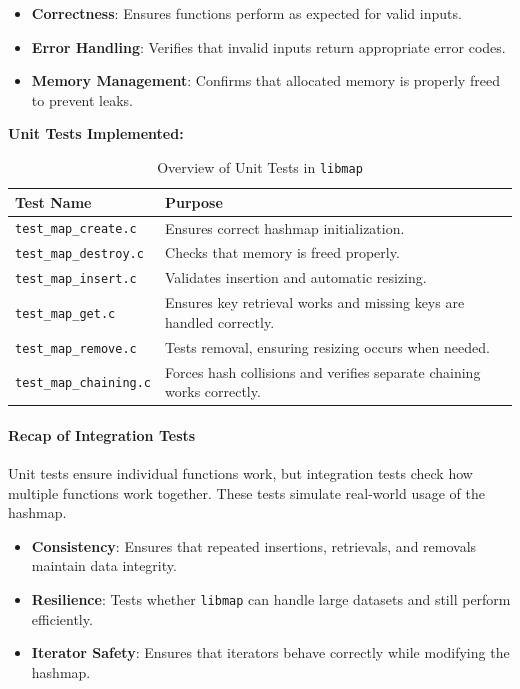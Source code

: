 \documentclass[titlepage]{article}
\begin{document}
\begin{itemize}
    \item \textbf{Correctness}: Ensures functions perform as expected for valid inputs.
    \item \textbf{Error Handling}: Verifies that invalid inputs return appropriate error codes.
    \item \textbf{Memory Management}: Confirms that allocated memory is properly freed to prevent leaks.
\end{itemize}

\textbf{Unit Tests Implemented:}

\begin{table}[h]
    \centering
    \renewcommand{\arraystretch}{1.3}
    \begin{tabular}{@{} l l @{} }
        \toprule
        \textbf{Test Name} & \textbf{Purpose} \\
        \midrule
        \texttt{test\_map\_create.c} & Ensures correct hashmap initialization. \\
        \texttt{test\_map\_destroy.c} & Checks that memory is freed properly. \\
        \texttt{test\_map\_insert.c} & Validates insertion and automatic resizing. \\
        \texttt{test\_map\_get.c} & Ensures key retrieval works and missing keys are handled correctly. \\
        \texttt{test\_map\_remove.c} & Tests removal, ensuring resizing occurs when needed. \\
        \texttt{test\_map\_chaining.c} & Forces hash collisions and verifies separate chaining works correctly. \\
        \bottomrule
    \end{tabular}
    \caption{Overview of Unit Tests in \texttt{libmap}}
\end{table}

\paragraph{Recap of Integration Tests}
Unit tests ensure individual functions work, but integration tests check how multiple functions work together. These tests simulate real-world usage of the hashmap.

\begin{itemize}
    \item \textbf{Consistency}: Ensures that repeated insertions, retrievals, and removals maintain data integrity.
    \item \textbf{Resilience}: Tests whether \texttt{libmap} can handle large datasets and still perform efficiently.
    \item \textbf{Iterator Safety}: Ensures that iterators behave correctly while modifying the hashmap.
\end{itemize}
\end{document}
